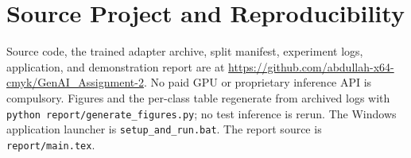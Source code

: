 \documentclass[conference]{IEEEtran}
\begin{document}
\section*{Source Project and Reproducibility}
Source code, the trained adapter archive, split manifest, experiment logs, application, and demonstration report are at \url{https://github.com/abdullah-x64-cmyk/GenAI_Assignment-2}. No paid GPU or proprietary inference API is compulsory. Figures and the per-class table regenerate from archived logs with \texttt{python report/generate\_figures.py}; no test inference is rerun. The Windows application launcher is \texttt{setup\_and\_run.bat}. The report source is \texttt{report/main.tex}.


\end{document}
